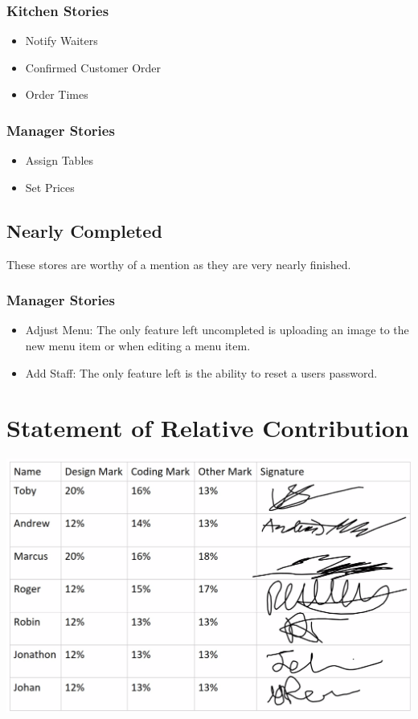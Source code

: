 \documentclass[12pt, twoside, a4paper]{report}
\begin{document}
\subsubsection*{Kitchen Stories}
\begin{itemize}
  \item Notify Waiters
  \item Confirmed Customer Order
  \item Order Times
\end{itemize}

\subsubsection*{Manager Stories}
\begin{itemize}
  \item Assign Tables
  \item Set Prices
\end{itemize}

\subsection*{Nearly Completed}
These stores are worthy of a mention as they are very nearly finished.

\subsubsection*{Manager Stories}
\begin{itemize}
  \item Adjust Menu:
    The only feature left uncompleted is uploading an image to the new menu item or when editing a menu item.
  \item Add Staff:
    The only feature left is the ability to reset a users password.
\end{itemize}

\section*{Statement of Relative Contribution}
\includegraphics[width=15cm]{StateOfCont.png}
\end{document}
